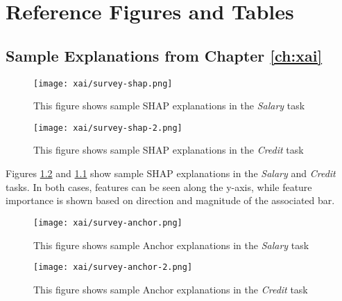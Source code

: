 

\chapter{\label{app:figures}Reference Figures and Tables}

\minitoc

\section{Sample Explanations from Chapter \ref{ch:xai}}\label{app:xaifigures}

\begin{figure}[htbp]
    \centering
    \texttt{[image: xai/survey-shap.png]}
    \caption{This figure shows sample SHAP explanations in the \emph{Salary} task}
    \label{fig:shapsalaryfull}
\end{figure}

\begin{figure}[hbtp]
    \centering
    \texttt{[image: xai/survey-shap-2.png]}
    \caption{This figure shows sample SHAP explanations in the \emph{Credit} task}
    \label{fig:shapcreditfull}
\end{figure}

Figures \ref{fig:shapcreditfull} and \ref{fig:shapsalaryfull} show sample SHAP explanations in the \emph{Salary} and \emph{Credit} tasks. In both cases, features can be seen along the y-axis, while feature importance is shown based on direction and magnitude of the associated bar.

\begin{figure}[htbp]
    \centering
    \texttt{[image: xai/survey-anchor.png]}
    \caption{This figure shows sample Anchor explanations in the \emph{Salary} task}
    \label{fig:anchorsalaryfull}
\end{figure}

\begin{figure}[hbtp]
    \centering
    \texttt{[image: xai/survey-anchor-2.png]}
    \caption{This figure shows sample Anchor explanations in the \emph{Credit} task}
    \label{fig:anchorcreditfull}
\end{figure}

